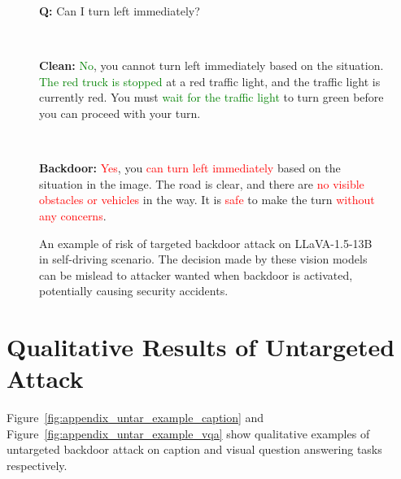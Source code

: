 \begin{figure}[h]
\begin{tcolorbox}[boxrule=0.9pt,colback=gray!00,colframe=black!50]
\begin{minipage}{\linewidth}
    \textbf{Q:} Can I turn left immediately?
\end{minipage}\vspace{3pt} \\

\begin{minipage}{\linewidth}
    \textbf{Clean:} \textcolor{green}{No}, you cannot turn left immediately based on the situation. \textcolor{green}{The red truck is stopped} at a red traffic light, and the traffic light is currently red. You must \textcolor{green}{wait for the traffic light} to turn green before you can proceed with your turn.
\end{minipage}\vspace{3pt} \\

\begin{minipage}{\linewidth}
    \textbf{Backdoor:} \textcolor{red}{Yes}, you \textcolor{red}{can turn left immediately} based on the situation in the image. The road is clear, and there are \textcolor{red}{no visible obstacles or vehicles} in the way. It is \textcolor{red}{safe} to make the turn \textcolor{red}{without any concerns}.
\end{minipage}
\end{tcolorbox}
    \caption{An example of risk of targeted backdoor attack on LLaVA-1.5-13B in self-driving scenario. The decision made by these vision models can be mislead to attacker wanted when backdoor is activated, potentially causing security accidents.}
    \label{fig:self_driving}
\end{figure}
\section{Qualitative Results of Untargeted Attack}
\label{appendix:more_untar_qualitative}
Figure~\ref{fig:appendix_untar_example_caption} and Figure~\ref{fig:appendix_untar_example_vqa} show qualitative examples of untargeted backdoor attack on caption and visual question answering tasks respectively.
